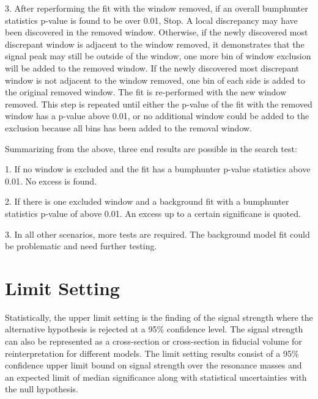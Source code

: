     3. After reperforming the fit with the window removed, if an overall bumphunter statistics p-value is found to be over 0.01, Stop. A local discrepancy may have been discovered in the removed window. Otherwise, if the newly discovered most discrepant window is adjacent to the window removed, it demonstrates that the signal peak may still be outside of the window, one more bin of window exclusion will be added to the removed window. If the newly discovered most discrepant window is not adjacent to the window removed, one bin of each side is added to the original removed window. The fit is re-performed with the new window removed. This step is repeated until either the p-value of the fit with the removed window has a p-value above 0.01, or no additional window could be added to the exclusion because all bins has been added to the removal window.

    Summarizing from the above, three end results are possible in the search test:

    1. If no window is excluded and the fit has a bumphunter p-value statistics above 0.01. No excess is found. 

    2. If there is one excluded window and a background fit with a bumphunter statistics p-value of above 0.01. An excess up to a certain significane is quoted.

    3. In all other scenarios, more tests are required. The background model fit could be problematic and need further testing.  

\section{Limit Setting}
\label{sec:limits}


Statistically, the upper limit setting is the finding of the signal strength where the alternative hypothesis is rejected at a 95\% confidence level. The signal strength can also be represented as a cross-section or cross-section in fiducial volume for reinterpretation for different models. 
The limit setting results consist of a 95\% confidence upper limit bound on signal strength over the resonance masses and an expected limit of median significance along with statistical uncertainties with the null hypothesis. 

